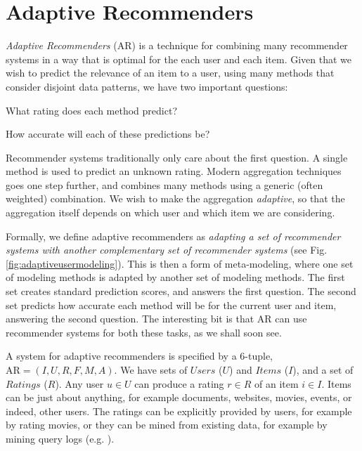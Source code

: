 \section{Adaptive Recommenders}
\label{sec:adaptive}

\emph{Adaptive Recommenders} (AR) is a technique for combining many recommender systems
in a way that is optimal for the each user and each item.
Given that we wish to predict the relevance of an item to a user,
using many methods that consider disjoint data patterns,
we have two important questions:

\begin{enumerate*}
  \item What rating does each method predict?
  \item How accurate will each of these predictions be?
\end{enumerate*}

Recommender systems traditionally only care about the first question.
A single method is used to predict an unknown rating.
Modern aggregation techniques goes one step further, and combines many methods using a generic (often weighted) combination.
We wish to make the aggregation \emph{adaptive},
so that the aggregation itself depends on which user and which item we are considering.

Formally, we define adaptive recommenders as \emph{adapting a set of recommender systems
with another complementary set of recommender systems} 
(see Fig. \ref{fig:adaptiveusermodeling}).
This is then a form of meta-modeling, where one set of modeling methods
is adapted by another set of modeling methods.
The first set creates standard prediction scores, and answers the first question.
The second set predicts how accurate each method will be for the current user and item,
answering the second question.
The interesting bit is that AR can use recommender systems for both these tasks, as we shall soon see.

A system for adaptive recommenders is specified by a 6-tuple, 
$\mathrm{AR} = (I,U,R,F,M,A)$.
We have sets of $Users$ ($U$) and $Items$ ($I$), 
and a set of $Ratings$ ($R$).
Any user $u \in U$ can produce a rating $r \in R$ of an item $i \in I$.
Items can be just about anything, for example documents, websites, movies, events, or indeed, other users.
The ratings can be explicitly provided by users, for example by rating movies,
or they can be mined from existing data, for example by mining query logs
(e.g. \cite{Liu2002, Sugiyama2004, Shen2005, Speretta2000}).

